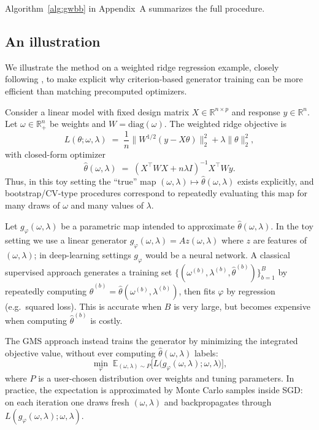\documentclass[12pt]{article}
\begin{document}
Algorithm~\ref{alg:gwbb} in Appendix~A summarizes the full procedure.

\subsection{An illustration}
\label{sec:toy-illustration}

We illustrate the method on a weighted ridge regression example, closely following \citet{shin2023generative}, to make explicit why criterion-based generator training can be more efficient than matching precomputed optimizers.

Consider a linear model with fixed design matrix $X\in\mathbb{R}^{n\times p}$ and response $y\in\mathbb{R}^n$. Let $\omega\in\mathbb{R}^n_+$ be weights and $W=\mathrm{diag}(\omega)$. The weighted ridge objective is
\[
L(\theta;\omega,\lambda)
\;=\;
\frac{1}{n}\|W^{1/2}(y-X\theta)\|_2^2 + \lambda\|\theta\|_2^2,
\]
with closed-form optimizer
\[
\hat{\theta}(\omega,\lambda)
\;=\;
\left(X^\top W X + n\lambda I\right)^{-1}X^\top W y.
\]
Thus, in this toy setting the ``true'' map $(\omega,\lambda)\mapsto\hat{\theta}(\omega,\lambda)$ exists explicitly, and bootstrap/CV-type procedures correspond to repeatedly evaluating this map for many draws of $\omega$ and many values of $\lambda$.

Let $g_{\varphi}(\omega,\lambda)$ be a parametric map intended to approximate $\hat{\theta}(\omega,\lambda)$. In the toy setting we use a linear generator $g_\varphi(\omega,\lambda) = A z(\omega,\lambda)$ where $z$ are features of $(\omega,\lambda)$; in deep-learning settings $g_\varphi$ would be a neural network. A classical supervised approach generates a training set $\{(\omega^{(b)},\lambda^{(b)},\hat{\theta}^{(b)})\}_{b=1}^B$ by repeatedly computing $\hat{\theta}^{(b)}=\hat{\theta}(\omega^{(b)},\lambda^{(b)})$, then fits $\varphi$ by regression (e.g.\ squared loss). This is accurate when $B$ is very large, but becomes expensive when computing $\hat{\theta}^{(b)}$ is costly.

The GMS approach instead trains the generator by minimizing the integrated objective value, without ever computing $\hat{\theta}(\omega,\lambda)$ labels:
\begin{equation}
\label{eq:gms-toy}
\min_{\varphi}\; \mathbb{E}_{(\omega,\lambda)\sim P}\Big[L\big(g_{\varphi}(\omega,\lambda);\omega,\lambda\big)\Big],
\end{equation}
where $P$ is a user-chosen distribution over weights and tuning parameters. In practice, the expectation is approximated by Monte Carlo samples inside SGD: on each iteration one draws fresh $(\omega,\lambda)$ and backpropagates through $L(g_{\varphi}(\omega,\lambda);\omega,\lambda)$.
\end{document}
